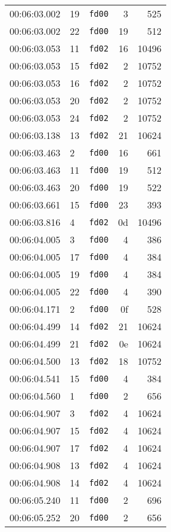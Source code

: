 \documentclass{article}
\begin{document}
\begin{longtable}{lllrr}
00:06:03.002 & 19 & \texttt{fd00} & 3 & 525 \\
00:06:03.002 & 22 & \texttt{fd00} & 19 & 512 \\
00:06:03.053 & 11 & \texttt{fd02} & 16 & 10496 \\
00:06:03.053 & 15 & \texttt{fd02} & 2 & 10752 \\
00:06:03.053 & 16 & \texttt{fd02} & 2 & 10752 \\
00:06:03.053 & 20 & \texttt{fd02} & 2 & 10752 \\
00:06:03.053 & 24 & \texttt{fd02} & 2 & 10752 \\
00:06:03.138 & 13 & \texttt{fd02} & 21 & 10624 \\
00:06:03.463 & 2 & \texttt{fd00} & 16 & 661 \\
00:06:03.463 & 11 & \texttt{fd00} & 19 & 512 \\
00:06:03.463 & 20 & \texttt{fd00} & 19 & 522 \\
00:06:03.661 & 15 & \texttt{fd00} & 23 & 393 \\
00:06:03.816 & 4 & \texttt{fd02} & 0d & 10496 \\
00:06:04.005 & 3 & \texttt{fd00} & 4 & 386 \\
00:06:04.005 & 17 & \texttt{fd00} & 4 & 384 \\
00:06:04.005 & 19 & \texttt{fd00} & 4 & 384 \\
00:06:04.005 & 22 & \texttt{fd00} & 4 & 390 \\
00:06:04.171 & 2 & \texttt{fd00} & 0f & 528 \\
00:06:04.499 & 14 & \texttt{fd02} & 21 & 10624 \\
00:06:04.499 & 21 & \texttt{fd02} & 0e & 10624 \\
00:06:04.500 & 13 & \texttt{fd02} & 18 & 10752 \\
00:06:04.541 & 15 & \texttt{fd00} & 4 & 384 \\
00:06:04.560 & 1 & \texttt{fd00} & 2 & 656 \\
00:06:04.907 & 3 & \texttt{fd02} & 4 & 10624 \\
00:06:04.907 & 15 & \texttt{fd02} & 4 & 10624 \\
00:06:04.907 & 17 & \texttt{fd02} & 4 & 10624 \\
00:06:04.908 & 13 & \texttt{fd02} & 4 & 10624 \\
00:06:04.908 & 14 & \texttt{fd02} & 4 & 10624 \\
00:06:05.240 & 11 & \texttt{fd00} & 2 & 696 \\
00:06:05.252 & 20 & \texttt{fd00} & 2 & 656 \\

\end{longtable}
\end{document}
